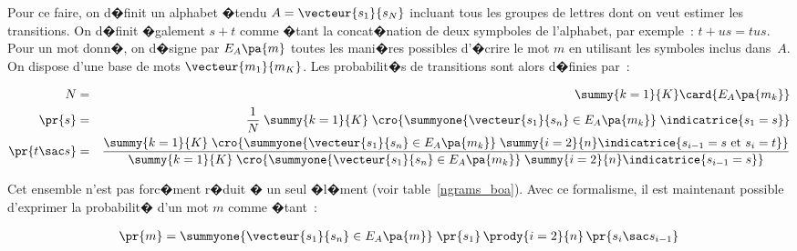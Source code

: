 
Pour ce faire, on d�finit un alphabet �tendu $A = \vecteur{s_1}{s_N}$ incluant tous les groupes de lettres dont on veut estimer les transitions. On d�finit �galement $s + t$ comme �tant la concat�nation de deux sympboles de l'alphabet, par exemple~: $t + us = tus$. Pour un mot donn�, on d�signe par $E_A\pa{m}$ toutes les mani�res possibles d'�crire le mot $m$ en utilisant les symboles inclus dans~$A$. On dispose d'une base de mots $\vecteur{m_1}{m_K}$. Les probabilit�s de transitions sont alors d�finies par~:

        \begin{eqnarray}
        N                        &=& \summy{k=1}{K} \card{ E_A\pa{m_k}} \nonumber \\
        \pr{ s }        &=&    \frac{1}{N} \;  \summy{k=1}{K} \;     \cro{ \summyone{ \vecteur{s_1}{s_n} \in E_A\pa{m_k} } \;  
                                                                                    \indicatrice{s_1 = s }} \\
        \pr{ t \sac s }        &=&    \frac{   \summy{k=1}{K} \;     \cro{ \summyone{ \vecteur{s_1}{s_n} \in E_A\pa{m_k} } \;  
                                                                                        \summy{i = 2}{n} \indicatrice{s_{i-1} = s \text{ et } s_i = t  }
                                                                                        }}
                                                             {
                                                                  \summy{k=1}{K} \;     \cro{ \summyone{ \vecteur{s_1}{s_n} \in E_A\pa{m_k} } \;  
                                                                                        \summy{i = 2}{n} \indicatrice{s_{i-1} = s }
                                                                                        }
                                                             }
        \end{eqnarray}

Cet ensemble n'est pas forc�ment r�duit � un seul �l�ment (voir table~\ref{ngrams_boa}). Avec ce formalisme, il est maintenant possible d'exprimer la probabilit� d'un mot $m$ comme �tant~:

        \begin{eqnarray}
        \pr{ m } = \summyone{ \vecteur{s_1}{s_n}  \in E_A\pa{m} } \;  \pr{ s_1} \, \prody{i = 2}{n} \, \pr{ s_i \sac s_{i-1} }
        \end{eqnarray}


